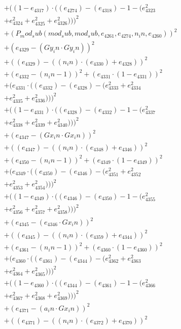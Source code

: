 \documentclass[10pt, a4paper]{article}
\begin{document}
\begin{small}
\begin{align*}
& + ((1 - e_{4317})  \cdot  ((e_{4274}) - (e_{4318}) - 1 - (e_{4323}^{2} \\
& + e_{4324}^{2} + e_{4325}^{2} + e_{4326}^{2})))^{2} \\
& + (P_mod_sub(mod_sub, mod_sub, e_{4261}, e_{4274}, n_in, e_{4260}))^{2} \\
& + (e_{4329} - (Gy_in  \cdot  Gy_in))^{2} \\
& + ((e_{4329}) - ((n_in)  \cdot  (e_{4330}) + e_{4328}))^{2} \\
& + (e_{4332} - (n_in - 1))^{2} + (e_{4331}  \cdot  (1 - e_{4331}))^{2} \\
& + (e_{4331}  \cdot  ((e_{4332}) - (e_{4328}) - (e_{4333}^{2} + e_{4334}^{2} \\
& + e_{4335}^{2} + e_{4336}^{2})))^{2} \\
& + ((1 - e_{4331})  \cdot  ((e_{4328}) - (e_{4332}) - 1 - (e_{4337}^{2} \\
& + e_{4338}^{2} + e_{4339}^{2} + e_{4340}^{2})))^{2} \\
& + (e_{4347} - (Gx_in  \cdot  Gx_in))^{2} \\
& + ((e_{4347}) - ((n_in)  \cdot  (e_{4348}) + e_{4346}))^{2} \\
& + (e_{4350} - (n_in - 1))^{2} + (e_{4349}  \cdot  (1 - e_{4349}))^{2} \\
& + (e_{4349}  \cdot  ((e_{4350}) - (e_{4346}) - (e_{4351}^{2} + e_{4352}^{2} \\
& + e_{4353}^{2} + e_{4354}^{2})))^{2} \\
& + ((1 - e_{4349})  \cdot  ((e_{4346}) - (e_{4350}) - 1 - (e_{4355}^{2} \\
& + e_{4356}^{2} + e_{4357}^{2} + e_{4358}^{2})))^{2} \\
& + (e_{4345} - (e_{4346}  \cdot  Gx_in))^{2} \\
& + ((e_{4345}) - ((n_in)  \cdot  (e_{4359}) + e_{4344}))^{2} \\
& + (e_{4361} - (n_in - 1))^{2} + (e_{4360}  \cdot  (1 - e_{4360}))^{2} \\
& + (e_{4360}  \cdot  ((e_{4361}) - (e_{4344}) - (e_{4362}^{2} + e_{4363}^{2} \\
& + e_{4364}^{2} + e_{4365}^{2})))^{2} \\
& + ((1 - e_{4360})  \cdot  ((e_{4344}) - (e_{4361}) - 1 - (e_{4366}^{2} \\
& + e_{4367}^{2} + e_{4368}^{2} + e_{4369}^{2})))^{2} \\
& + (e_{4371} - (a_in  \cdot  Gx_in))^{2} \\
& + ((e_{4371}) - ((n_in)  \cdot  (e_{4372}) + e_{4370}))^{2} \\

\end{align*}
\end{small}
\end{document}
